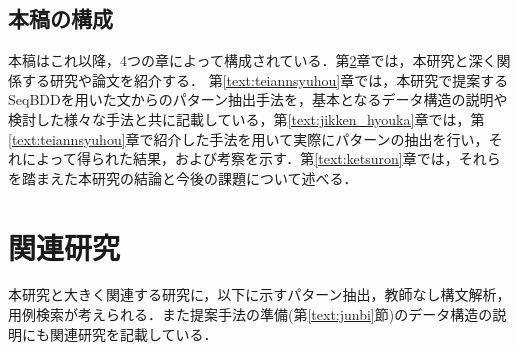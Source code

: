 \documentclass[12pt,twoside, fleqn]{ujbook}
\begin{document}
\section{本稿の構成}
本稿はこれ以降，4つの章によって構成されている．第\ref{text:kanrenkenkyuu}章では，本研究と深く関係する研究や論文を紹介する．
第\ref{text:teiannsyuhou}章では，本研究で提案するSeqBDDを用いた文からのパターン抽出手法を，基本となるデータ構造の説明や検討した様々な手法と共に記載している，第\ref{text:jikken_hyouka}章では，第\ref{text:teiannsyuhou}章で紹介した手法を用いて実際にパターンの抽出を行い，それによって得られた結果，および考察を示す．第\ref{text:ketsuron}章では，それらを踏まえた本研究の結論と今後の課題について述べる．




\chapter{関連研究}
\label{text:kanrenkenkyuu}
本研究と大きく関連する研究に，以下に示すパターン抽出，教師なし構文解析，用例検索が考えられる．また提案手法の準備(第\ref{text:junbi}節)のデータ構造の説明にも関連研究を記載している．
\end{document}
